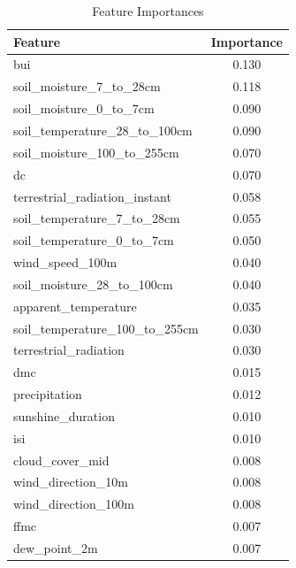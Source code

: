 \begin{table}[H]
	\caption{Feature Importances}
	\centering
	\label{feature_importances}
	\begin{tabular}{lc}
		\hline
		Feature                                & Importance \\ \hline
		bui                                        & 0.130       \\ 
		soil\_moisture\_7\_to\_28cm             & 0.118       \\ 
		soil\_moisture\_0\_to\_7cm               & 0.090       \\ 
		soil\_temperature\_28\_to\_100cm        & 0.090       \\ 
		soil\_moisture\_100\_to\_255cm         & 0.070       \\ 
		dc                                         & 0.070       \\ 
		terrestrial\_radiation\_instant           & 0.058       \\ 
		soil\_temperature\_7\_to\_28cm          & 0.055       \\ 
		soil\_temperature\_0\_to\_7cm           & 0.050       \\ 
		wind\_speed\_100m                        & 0.040       \\ 
		soil\_moisture\_28\_to\_100cm          & 0.040       \\ 
		apparent\_temperature                 & 0.035       \\ 
		soil\_temperature\_100\_to\_255cm       & 0.030       \\ 
		terrestrial\_radiation                   & 0.030       \\ 
		dmc                                        & 0.015       \\ 
		precipitation                          & 0.012       \\ 
		sunshine\_duration                      & 0.010       \\ 
		isi                                        & 0.010       \\ 
		cloud\_cover\_mid                       & 0.008       \\ 
		wind\_direction\_10m                    & 0.008       \\ 
		wind\_direction\_100m                   & 0.008       \\ 
		ffmc                                       & 0.007       \\ 
		dew\_point\_2m                          & 0.007       \\ 

\end{tabular}
\end{table}
